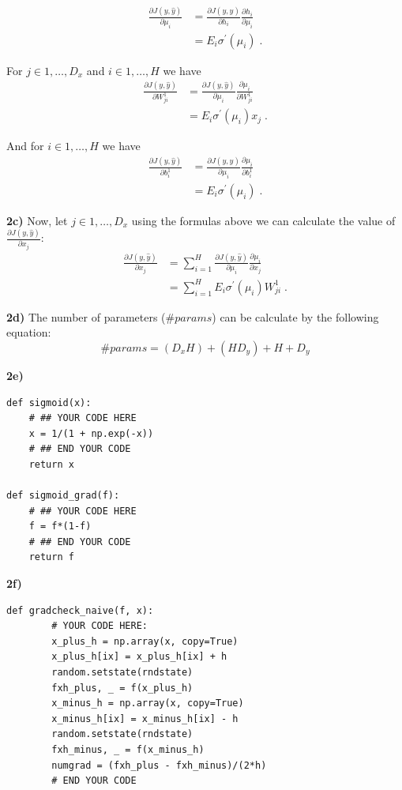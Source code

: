 \documentclass{article}
\begin{document}
\begin{align*}
\frac{\partial J(y,\hat{y})}{\partial \mu_{i}}  & =\frac{\partial J(y,\hat{y})}{\partial h_i} \frac{\partial h_i}{\partial \mu_{i}} \\
& = E_{i}\sigma^{\prime}(\mu_{i})\; .
\end{align*}

For $j \in {1,\dots,D_{x}}$  and $ i \in {1,\dots,H}$ we have
\begin{align*}
\frac{\partial J(y,\hat{y})}{\partial W^{1}_{ji}}  & = \frac{\partial J(y,\hat{y})}{\partial \mu_{i}} \frac{\partial\mu_{i}}{\partial  W^{1}_{ji}} \\
& =  E_{i}\sigma^{\prime}(\mu_{i})x_{j}\; .
\end{align*}

And for $ i \in {1,\dots,H}$ we have
\begin{align*}
\frac{\partial J(y,\hat{y})}{\partial b^{1}_{i}}  & = \frac{\partial J(y,\hat{y})}{\partial \mu_{i}} \frac{\partial\mu_{i}}{\partial  b^{1}_{i}} \\
& =  E_{i}\sigma^{\prime}(\mu_{i})\; .
\end{align*}

\textbf{2c)} Now, let $j \in {1,\dots,D_{x}}$ using the formulas above we can calculate the value of $\frac{\partial J(y,\hat{y})}{\partial x_{j}}$:
\begin{align*}
\frac{\partial J(y,\hat{y})}{\partial x_{j}}  & = \sum_{i=1}^{H}\frac{\partial J(y,\hat{y})}{\partial \mu_{i}} \frac{\partial\mu_{i}}{\partial  x_{j}} \\
& =  \sum_{i=1}^{H}E_{i}\sigma^{\prime}(\mu_{i})W^{1}_{ji}\; .
\end{align*}

\textbf{2d)} The number of parameters ($\# params$) can be calculate by the following equation:
\[
\# params = (D_{x}H) + (H D_{y}) + H + D_{y}
\]

\textbf{2e)}
\begin{verbatim}
def sigmoid(x):
    # ## YOUR CODE HERE
    x = 1/(1 + np.exp(-x))
    # ## END YOUR CODE
    return x
    
def sigmoid_grad(f):
    # ## YOUR CODE HERE
    f = f*(1-f)
    # ## END YOUR CODE
    return f
\end{verbatim}

\textbf{2f)}

\begin{verbatim}
def gradcheck_naive(f, x):
        # YOUR CODE HERE:
        x_plus_h = np.array(x, copy=True)
        x_plus_h[ix] = x_plus_h[ix] + h
        random.setstate(rndstate)
        fxh_plus, _ = f(x_plus_h)
        x_minus_h = np.array(x, copy=True)
        x_minus_h[ix] = x_minus_h[ix] - h
        random.setstate(rndstate)
        fxh_minus, _ = f(x_minus_h)
        numgrad = (fxh_plus - fxh_minus)/(2*h)
        # END YOUR CODE
\end{verbatim}
\end{document}
